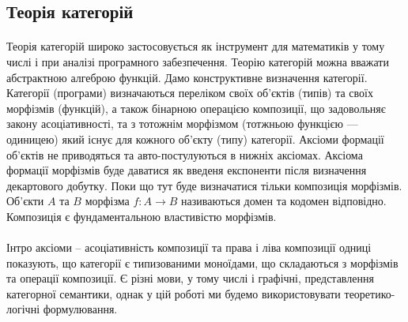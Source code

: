 \subsection{Теорія категорій}

    \paragraph{}
    Теорія категорій широко застосовується як інструмент для математиків у тому числі і
    при аналізі програмного забезпечення. Теорію категорій можна вважати абстрактною алгеброю функцій.
    Дамо конструктивне визначення категорії.
    Категорії (програми) визначаються переліком своїх об’єктів (типів) та своїх
    морфізмів (функцій), а також бінарною операцією композиції,
    що задовольняє закону асоціативності, та з тотожнім морфізмом (тотжньою функцією --- одиницею) який існує
    для кожного об’єкту (типу) категорії. Аксіоми формації об’єктів не
    приводяться та авто-постулуються в нижніх аксіомах. Аксіома формації
    морфізмів буде даватися як введеня експоненти після визначення декартового добутку.
    Поки що тут буде визначатися тільки композиція морфізмів. Об’єкти $A$ та $B$ морфізма $f: A \rightarrow B$
    називаються домен та кодомен відповідно. Композиція є фундаментальною властивістю морфізмів.

    \paragraph{}
    Інтро аксіоми -- асоціативність композиції та права і ліва композиції одниці показують,
    що категорії є типизованими моноїдами, що складаються з морфізмів та операції композиції.
    Є різні мови, у тому числі і графічні, представлення категорної семантики, однак у цій роботі
    ми будемо використовувати теоретико-логічні формулювання.

